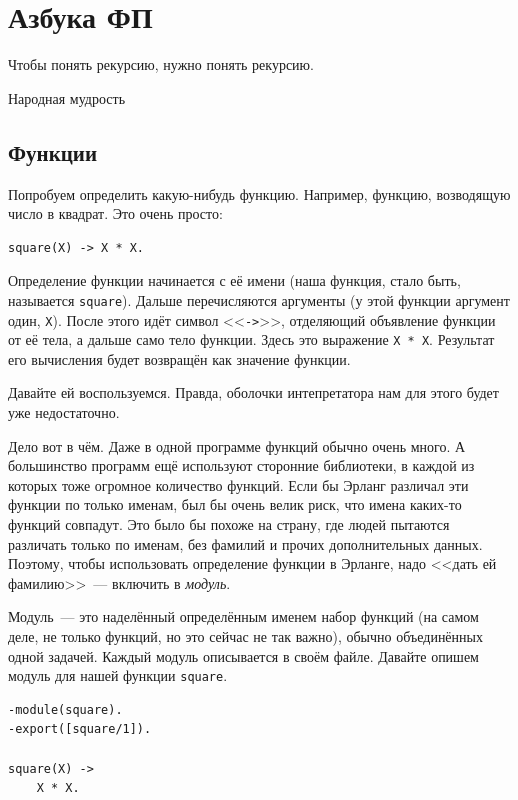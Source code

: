 \documentclass[
  paper=a4,
  fontsize=14pt,
  openany,
  appendixprefix=true
]{scrbook}
\begin{document}
\chapter{Азбука ФП}

\epigraph{Чтобы понять рекурсию, нужно понять рекурсию.}{Народная мудрость}

\section{Функции}

Попробуем определить какую-нибудь функцию. Например, функцию, возводящую число в квадрат. Это очень просто:

\label{square}
\begin{lstlisting}
square(X) -> X * X.
\end{lstlisting}

Определение функции начинается с её имени (наша функция, стало быть, называется \lstinline{square}). Дальше перечисляются аргументы (у этой функции аргумент один, \lstinline{X}). После этого идёт символ <<\lstinline{->}>>, отделяющий объявление функции от её тела, а дальше само тело функции. Здесь это выражение \lstinline{X * X}. Результат его вычисления будет возвращён как значение функции.

Давайте ей воспользуемся. Правда, оболочки интепретатора нам для этого будет уже недостаточно.

Дело вот в чём. Даже в одной программе функций обычно очень много. А большинство программ ещё используют сторонние библиотеки, в каждой из которых тоже огромное количество функций. Если бы Эрланг различал эти функции по только именам, был бы очень велик риск, что имена каких-то функций совпадут. Это было бы похоже на страну, где людей пытаются различать только по именам, без фамилий и прочих дополнительных данных. Поэтому, чтобы использовать определение функции в Эрланге, надо <<дать ей фамилию>>~--- включить в \emph{модуль}.

Модуль~--- это наделённый определённым именем набор функций (на самом деле, не только функций, но это сейчас не так важно), обычно объединённых одной задачей. Каждый модуль описывается в своём файле. Давайте опишем модуль для нашей функции \lstinline{square}.

\begin{lstlisting}
-module(square).
-export([square/1]).

square(X) ->
    X * X.
\end{lstlisting}
\end{document}
